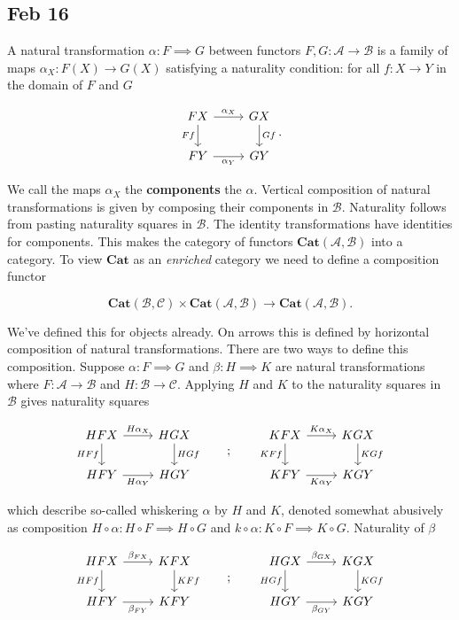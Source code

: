 \documentclass[11pt]{amsart}
\theoremstyle{plain}
\theoremstyle{definition}
\newcommand{\cA}{{\mathcal A}}
\newcommand{\cB}{{\mathcal B}}
\newcommand{\cC}{{\mathcal C}}
\newcommand{\Cat}{\mathbf{Cat}}
\newcommand{\noi}{{\noindent}}
\begin{document}
\subsection{Feb 16}

A natural transformation $\alpha : F \implies G$ between functors $F, G : \cA \to \cB$ is a family of maps $\alpha_X : F(X) \to G(X)$ satisfying a naturality condition: for all $f : X \to Y$ in the domain of $F$ and $G$ 

\[ \begin{tikzcd}
  FX \rar["\alpha_X"] \dar["Ff"'] & GX \dar["Gf"] \\
FY \rar["\alpha_Y"'] & GY
\end{tikzcd}.\]

\noi We call the maps $\alpha_X$ the \textbf{components} the $\alpha$. Vertical composition of natural transformations is given by composing their components in $\cB$. Naturality follows from pasting naturality squares in $\cB$. The identity transformations have identities for components. This makes the category of functors $\Cat(\cA, \cB)$ into a category. To view $\Cat$ as an \textit{enriched} category we need to define a composition functor 

\[ \Cat(\cB, \cC) \times \Cat(\cA, \cB) \to \Cat(\cA,\cB).\]

\noi We've defined this for objects already. On arrows this is defined by horizontal composition of natural transformations. There are two ways to define this composition. Suppose $\alpha : F \implies G$ and $\beta : H \implies K$ are natural transformations where $F: \cA \to \cB$ and $H: \cB \to \cC$. Applying $H$ and $K$ to the naturality squares in $\cB$ gives naturality squares 

\[ \begin{tikzcd}
  HFX \rar["H\alpha_X"] \dar["HFf"'] & HGX \dar["HGf"] \\
HFY \rar["H\alpha_Y"'] & HGY
\end{tikzcd}\qquad ; \qquad 
\begin{tikzcd}
  KFX \rar["K\alpha_X"] \dar["KFf"'] & KGX \dar["KGf"] \\
KFY \rar["K\alpha_Y"'] & KGY
\end{tikzcd}\]


\noi which describe so-called whiskering $\alpha$ by $H$ and $K$, denoted somewhat abusively as composition $H \circ \alpha : H \circ F \implies H \circ G$ and $k \circ \alpha : K \circ F \implies K \circ G$. Naturality of $\beta$ 

\[ \begin{tikzcd}
  HFX \rar["\beta_{FX}"] \dar["HFf"'] & KFX \dar["KFf"] \\
HFY \rar["\beta_{FY}"'] & KFY
\end{tikzcd}\qquad ; \qquad 
\begin{tikzcd}
  HGX \rar["\beta_{GX}"] \dar["HGf"'] & KGX \dar["KGf"] \\
HGY \rar["\beta_{GY}"'] & KGY
\end{tikzcd}\]
\end{document}
